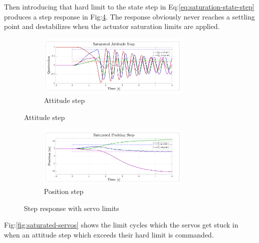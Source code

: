 \par
Then introducing that hard limit to the state step in Eq:\ref{eq:saturation-state-step} produces a step response in Fig:\ref{fig:saturated-step}. The response obviously never reaches a settling point and destabilizes when the actuator saturation limits are applied.
\begin{figure}[hbtp]
\vspace{-12pt}
\centering
\begin{subfigure}{\textwidth}
\centering
\includegraphics[width=0.8\textwidth]{graphs/saturated-attitude-step}
\vspace{-10pt}
\caption{Attitude step}
\label{fig:saturated-attitude}
\vspace{-16pt}
\end{subfigure}
\vspace{-24pt}
\end{figure}
\newpage
\begin{figure}\ContinuedFloat
\vspace{-8pt}
\centering
\begin{subfigure}{\textwidth}
\centering
\includegraphics[width=0.8\textwidth]{graphs/saturated-position-step}
\vspace{-10pt}
\caption{Position step}
\label{fig:saturated-position}
\end{subfigure}
\vspace{-6pt}
\caption{Step response with servo limits}
\label{fig:saturated-step}
\vspace{-18pt}
\end{figure}
\par
Fig:\ref{fig:saturated-servos} shows the limit cycles which the servos get stuck in when an attitude step which exceeds their hard limit is commanded.
